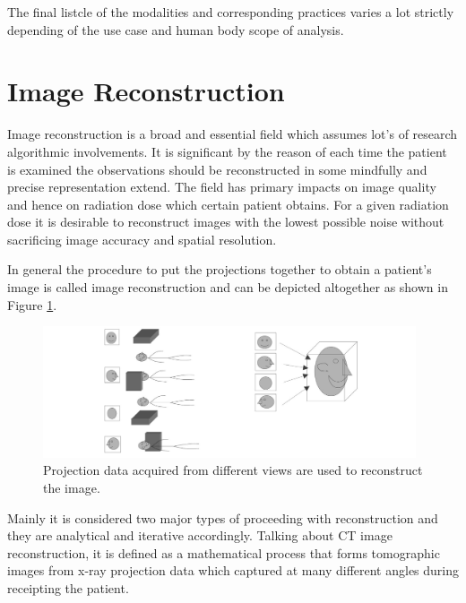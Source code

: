 The final listcle of the modalities and corresponding practices varies a lot strictly depending of the use case and human body scope of analysis.

\section{Image Reconstruction}
Image reconstruction is a broad and essential field which assumes lot's of research algorithmic involvements. It is significant by the reason of each time the patient is examined the observations should be reconstructed in some mindfully and precise representation extend.    
The field has primary impacts on image quality and hence on radiation dose which certain patient obtains. For a given radiation dose it is desirable to reconstruct images with the lowest possible noise without sacrificing image accuracy and spatial resolution.

In general the procedure to put the projections together to obtain a patient's image is called image reconstruction and can be depicted altogether as shown in Figure \ref{fig:image_reconstruction}.
\begin{figure}[h!]
    \centering \includegraphics[width=11cm]{images/image_reconstruction.png}
    \caption {Projection data acquired from different views are used to reconstruct the image.}
    \label{fig:image_reconstruction}
\end{figure}

Mainly it is considered two major types of proceeding with reconstruction and they are analytical and iterative accordingly. Talking about CT image reconstruction, it is defined as a mathematical process that forms tomographic images from x-ray projection data which captured at many different angles during receipting the patient.






